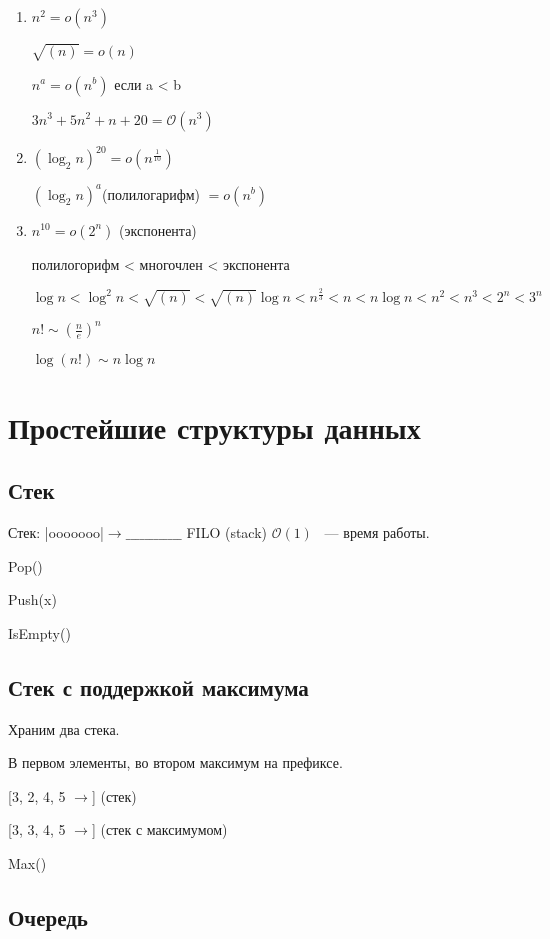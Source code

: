 \documentclass[12pt]{article}
\def\O{\mathcal{O}}
\begin{document}
\begin{enumerate}
\item

$n^2 = o(n^3)$

$\sqrt{(n)} = o(n)$

$n^a = o(n^b)$ если a < b

$3n^3 + 5n^2 + n + 20 = \O(n^3)$

\item

$(\log_2n)^{20} = o(n^{\frac{1}{10}})$

$(\log_2n)^{a}$(полилогарифм) $= o(n^{b})$

\item
$n^{10} = o(2^n)$ (экспонента)

полилогорифм < многочлен < экспонента

$\log n < \log^2 n < \sqrt{(n)} < \sqrt{(n)}\log n < n^{\frac{2}{3}} < n < n\log n < n^2 < n^3 < 2^n < 3^n$

$n! \sim (\frac{n}{e})^n$

$\log(n!) \sim n\log n$
\end{enumerate}

\section{Простейшие структуры данных}
\subsection{Стек}
 Стек: |ooooooo|$\to\_\_\_\_\_\_\_\_\_\_\_\_$  FILO (stack)
$\O(1)$ ~--- время работы.

Pop()

Push(x)

IsEmpty()

\subsection{Стек с поддержкой максимума}
Храним два стека. 

В первом элементы, во втором максимум на префиксе.

[3, 2, 4, 5 $\to$] (стек)

[3, 3, 4, 5 $\to$] (стек с максимумом)

Max()

\subsection{Очередь}
\end{document}
